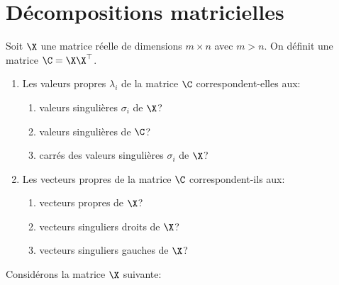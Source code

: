 \documentclass[11pt]{article}
\begin{document}
\section{Décompositions matricielles}
Soit $\X$ une matrice réelle de dimensions $m \times n$ avec $m > n$. On définit une matrice $\C = \X\X^\top$.
\begin{enumerate}
	\item Les valeurs propres $\lambda_i$ de la matrice $\C$ correspondent-elles aux:
	\begin{enumerate}
		\item valeurs singulières $\sigma_i$ de $\X$?
		\item valeurs singulières de $\C$?
		\item carrés des valeurs singulières $\sigma_i$ de $\X$?
	\end{enumerate}
	\item Les vecteurs propres de la matrice $\C$ correspondent-ils aux:
	\begin{enumerate}
		\item vecteurs propres de $\X$?
		\item vecteurs singuliers droits de $\X$?
		\item vecteurs singuliers gauches de $\X$?
	\end{enumerate}
\end{enumerate}
Considérons la matrice $\X$ suivante:
\end{document}

